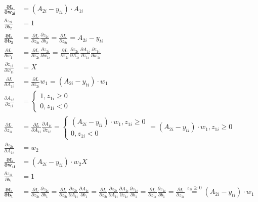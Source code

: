 \documentclass{article}
\begin{document}
\begin{align*}
\boldsymbol{\frac{\partial L}{\partial w_{2i}}} &= (A_{2i} - y_{ti}) \cdot A_{1i} \\
\frac{\partial z_{2i}}{\partial b_2} &= 1 \\
\boldsymbol{\frac{\partial L}{\partial b_2}} &= \frac{\partial L}{\partial z_{2i}} \frac{\partial z_{2i}}{\partial b_2} = \frac{\partial L}{\partial z_{2i}} = A_{2i} - y_{ti}\\
\frac{\partial L}{\partial w_1} &= \frac{\partial L}{\partial z_{2i}}\frac{\partial z_{2i}}{\partial w_{1i}} = \frac{\partial L}{\partial z_{2i}} \frac{\partial z_{2i}}{\partial A_{1i}} \frac{\partial A_{1i}}{\partial z_{1i}} \frac{\partial z_{1i}}{\partial w_{1i}} \\
\frac{\partial z_{1i}}{\partial w_{1i}} &= X \\
\frac{\partial L}{\partial A_{1i}} &= \frac{\partial L}{\partial z_{2i}} w_1 = (A_{2i} - y_{ti}) \cdot w_1 \\
\frac{\partial A_{1i}}{\partial z_{1i}} &= \begin{cases}
1, z_{1i} \geq 0 \\
0, z_{1i} < 0
\end{cases} \\
\frac{\partial L}{\partial z_{1i}} &= \frac{\partial L}{\partial A_{1i}} \frac{\partial A_{1i}}{\partial z_{1i}} = \begin{cases}
(A_{2i} - y_{ti}) \cdot w_1 , z_{1i} \geq 0 \\
0, z_{1i} < 0
\end{cases} = (A_{2i} - y_{ti}) \cdot w_1 , z_{1i} \geq 0 \\
\frac{\partial z_{2i}}{\partial A_{1i}} &= w_2 \\
\boldsymbol{\frac{\partial L}{\partial w_{1i}}} &= (A_{2i} - y_{ti}) \cdot w_2 X \\
\frac{\partial z_{1i}}{\partial b_1} &= 1 \\
\boldsymbol{\frac{\partial L}{\partial b_1}} &= \frac{\partial L}{\partial z_{2i}} \frac{\partial z_{2i}}{\partial b_1} =  \frac{\partial L}{\partial z_{2i}} \frac{\partial z_{2i}}{\partial A_{1i}}  \frac{\partial A_{1i}}{\partial b_1} = \frac{\partial L}{\partial z_{2i}} \frac{\partial z_{2i}}{\partial A_{1i}} \frac{\partial A_{1i}}{\partial z_{1i}} \frac{\partial z_{1i}}{\partial b_1} = \frac{\partial L}{\partial z_{1i}} \frac{\partial z_{1i}}{\partial b_1} = \frac{\partial L}{\partial z_{1i}} \overset{z_{1i} \geq 0}{=} (A_{2i} - y_{ti}) \cdot w_1
\end{align*}
\end{document}
